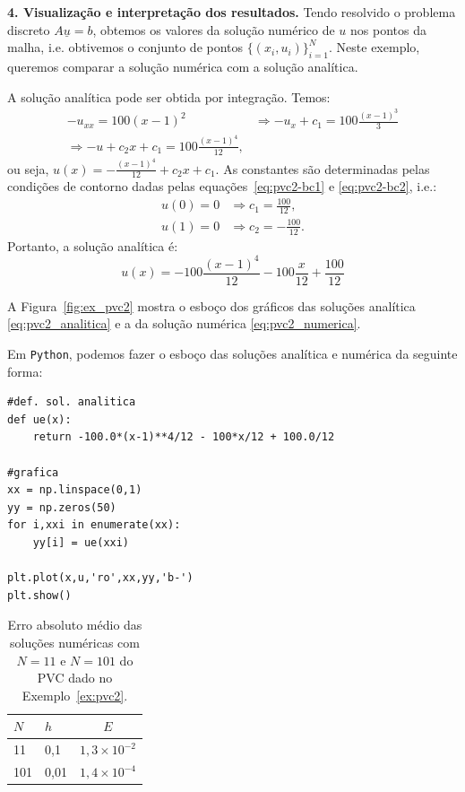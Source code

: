 \begin{sol}
{\bf 4. Visualização e interpretação dos resultados.} Tendo resolvido o problema discreto $A\underline{u} = b$, obtemos os valores da solução numérico de $u$ nos pontos da malha, i.e. obtivemos o conjunto de pontos $\{(x_i, u_i)\}_{i=1}^N$. Neste exemplo, queremos comparar a solução numérica com a solução analítica.

A solução analítica pode ser obtida por integração. Temos:
\begin{equation*}
  \begin{split}
    -u_{xx} = 100(x-1)^2 &\Rightarrow -u_x + c_1 = 100\frac{(x-1)^3}{3}\\
    \Rightarrow -u + c_2x + c_1 = 100\frac{(x-1)^4}{12},
  \end{split}
\end{equation*}
ou seja, $\displaystyle u(x) = - \frac{(x-1)^4}{12} + c_2x + c_1$. As constantes são determinadas pelas condições de contorno dadas pelas equações~\eqref{eq:pvc2-bc1} e \eqref{eq:pvc2-bc2}, i.e.:
\begin{equation*}
  \begin{split}
    u(0) = 0 &\Rightarrow c_1 = \frac{100}{12},\\
    u(1) = 0 &\Rightarrow c_2 = -\frac{100}{12}.
  \end{split}
\end{equation*}
Portanto, a solução analítica é:
\begin{equation}\label{eq:pvc2_analitica}
  u(x) = -100\frac{(x-1)^4}{12} - 100\frac{x}{12} + \frac{100}{12}
\end{equation}

A Figura~\ref{fig:ex_pvc2} mostra o esboço dos gráficos das soluções analítica \eqref{eq:pvc2_analitica} e a da solução numérica \eqref{eq:pvc2_numerica}.

\ifispython
Em \verb+Python+, podemos fazer o esboço das soluções analítica e numérica da seguinte forma:
\begin{verbatim}
#def. sol. analitica
def ue(x):
    return -100.0*(x-1)**4/12 - 100*x/12 + 100.0/12

#grafica
xx = np.linspace(0,1)
yy = np.zeros(50)
for i,xxi in enumerate(xx):
    yy[i] = ue(xxi)

plt.plot(x,u,'ro',xx,yy,'b-')
plt.show()
\end{verbatim}
\fi

\begin{table}
  \centering
  \caption{Erro absoluto médio das soluções numéricas com $N=11$ e $N=101$ do PVC dado no Exemplo~\ref{ex:pvc2}.}
  \begin{tabular}{ll|c}
    $N$ & $h$ & $E$\\\hline
    11 & 0,1 & $1,3\times 10^{-2}$\\
    101 & 0,01 & $1,4\times 10^{-4}$
  \end{tabular}
  \label{tab:pvc2_erro}
\end{table}


\end{sol}
